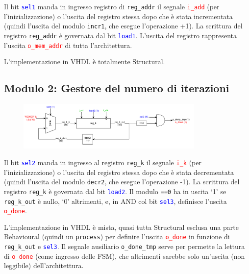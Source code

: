 \documentclass{article}
\begin{document}
Il bit \texttt{\textcolor{blue}{sel1}} manda in ingresso registro di \texttt{reg\_addr} il segnale \texttt{\textcolor{red}{i\_add}} (per l’inizializzazione) o l’uscita del registro stessa dopo che è stata incrementata (quindi l’uscita del modulo \texttt{incr1}, che esegue l’operazione +1). La scrittura del registro \texttt{reg\_addr} è governata dal bit \texttt{\textcolor{blue}{load1}}. L’uscita del registro rappresenta l’uscita \texttt{\textcolor{red}{o\_mem\_addr}} di tutta l’architettura.

L’implementazione in VHDL è totalmente Structural.

\subsection{Modulo 2: Gestore del numero di iterazioni}

\begin{figure}[H]
  \centering
  \includegraphics[width=0.82\textwidth]{modulo2.pdf}
  \label{fig:Modulo 2: gestore del numero di iterazioni}
\end{figure}

Il bit \texttt{\textcolor{blue}{sel2}} manda in ingresso al registro \texttt{reg\_k} il segnale \texttt{\textcolor{red}{i\_k}} (per l’inizializzazione) o l’uscita del registro stessa dopo che è stata decrementata (quindi l’uscita del modulo \texttt{decr2}, che esegue l’operazione -1). La scrittura del registro \texttt{reg\_k} è governata dal bit \texttt{\textcolor{blue}{load2}}. Il modulo \texttt{==0} ha in uscita ‘1’ se \texttt{reg\_k\_out} è nullo, ‘0’ altrimenti, e, in AND col bit \texttt{\textcolor{blue}{sel3}}, definisce l’uscita \texttt{\textcolor{red}{o\_done}}.

L’implementazione in VHDL è mista, quasi tutta Structural esclusa una parte Behavioural (quindi un \texttt{process}) per definire l’uscita \texttt{\textcolor{red}{o\_done}} in funzione di \texttt{reg\_k\_out} e \texttt{\textcolor{blue}{sel3}}. Il segnale ausiliario \texttt{o\_done\_tmp} serve per permette la lettura di \texttt{\textcolor{red}{o\_done}} (come ingresso delle FSM), che altrimenti sarebbe solo un’uscita (non leggibile) dell’architettura.
\end{document}
